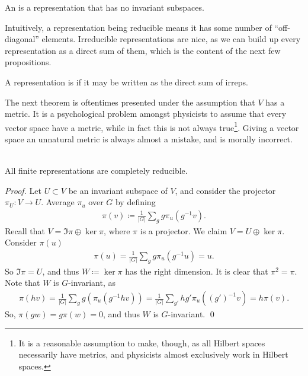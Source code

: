 \documentclass[11pt]{article}
\begin{document}
\begin{definition}
    An  is a representation
    that has no invariant subspaces.
\end{definition}

Intuitively, a representation being reducible means it has
some number of ``off-diagonal'' elements. Irreducible representations
are nice, as we can build up every representation as a direct sum
of them, which is the content of the next few propositions.

\begin{definition}
    A representation is  if
    it may be written as the direct sum of irreps.
\end{definition}

\begin{reemark}
    [Unitarity]
    The next theorem is oftentimes presented under the assumption
    that $V$ has a metric. It is a psychological problem amongst physicists 
    to assume that every vector space have a metric, while in fact this is not 
    always true\footnote{It is a reasonable assumption to make, though, as all 
    Hilbert spaces necessarily have metrics, and physicists almost exclusively 
    work in Hilbert spaces.}. Giving a vector space an unnatural
    metric is always almost a mistake, and is morally incorrect.
\end{reemark}

\begin{theorem}{}\\
    All finite representations are completely reducible.
\end{theorem}

\begin{proof}
    Let $U \subset V$ be an invariant subspace of $V$, and
    consider the projector $\pi_U \colon V \to U$.
    Average $\pi_u$ over $G$ by defining
    \begin{align*}
        \pi(v) \coloneqq \frac{1}{|G|} \sum_g g \pi_u(g^{-1} v).
    \end{align*}
    Recall that $V = \Im{\pi} \oplus \ker{\pi}$, where $\pi$ is a
    projector. We claim $V = U \oplus \ker{\pi}$. Consider $\pi(u)$
    \begin{align*}
        \pi(u) = \frac{1}{|G|} \sum_g g \pi_u(g^{-1}u) = u.
    \end{align*}
    So $\Im{\pi} = U$, and thus $W \coloneqq \ker{\pi}$ has
    the right dimension. It is clear that $\pi^2 = \pi$. Note 
    that $W$ is $G$-invariant, as
    \begin{align*}
        \pi(hv) = \frac{1}{|G|} \sum_g g(\pi_u(g^{-1}hv)) = \frac{1}{|G|} \sum_{g'} hg' \pi_u((g')^{-1}v) = h \pi(v).
    \end{align*}
    So, $\pi(gw) = g\pi(w) = 0$, and thus $W$ is $G$-invariant.
    \qed
\end{proof}
\end{document}
